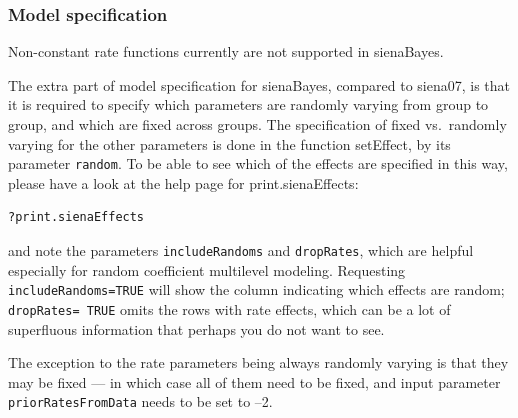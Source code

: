 \documentclass[a4paper,fleqn,11pt]{article}
\newcommand{\+}{\, + \,}
\newcommand{\sfn}[1]{\textsf{#1}}
\begin{document}
\subsubsection{Model specification}

Non-constant rate functions currently are not supported in \sfn{sienaBayes}.

The extra part of model specification for \sfn{sienaBayes},
compared to \sfn{siena07},
is that it is required to specify which parameters are
randomly varying from group to group, and which are fixed across groups.
The specification of fixed vs.\ randomly varying
for the other parameters is done in the function
\sfn{setEffect}, by its parameter \texttt{random}.
To be able to see which of the effects are specified in this way,
please have a look at the help page for \sfn{print.sienaEffects}:
\begin{verbatim}
?print.sienaEffects
\end{verbatim}
and note the parameters \texttt{includeRandoms}
and \texttt{dropRates}, which are helpful especially for
random coefficient multilevel modeling.
Requesting \texttt{includeRandoms=TRUE} will show the column indicating
which effects are random; \texttt{dropRates= TRUE} omits the
rows with rate effects, which can be a lot of superfluous information
that perhaps you do not want to see.

The exception to the rate parameters being always randomly varying
is that they may be fixed --- in which case all of them need to be fixed,
and input parameter \\
\texttt{priorRatesFromData} needs to be set to --2.
\medskip
\end{document}
